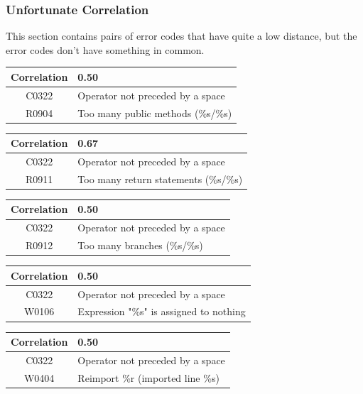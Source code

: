 \documentclass[12pt, a4paper]{article}
\newcommand{\tbf}[1]{\textbf{#1}}
\newcommand{\noi}{\noindent}
\begin{document}
\subsubsection*{Unfortunate Correlation}

This section contains pairs of error codes that have quite a low distance, but the error codes don't have something in common.

\bigskip \noi
\begin{tabularx}{\textwidth}{|c|X|}
\hline
\tbf{Correlation}		& 0.50 \\
\hline
C0322		& Operator not preceded by a space \\
\hline
R0904		& Too many public methods (\%s/\%s) \\
\hline
\end{tabularx}

\bigskip \noi
\begin{tabularx}{\textwidth}{|c|X|}
\hline
\tbf{Correlation}		& 0.67 \\
\hline
C0322		& Operator not preceded by a space \\
\hline
R0911		& Too many return statements (\%s/\%s) \\
\hline
\end{tabularx}


\bigskip \noi
\begin{tabularx}{\textwidth}{|c|X|}
\hline
\tbf{Correlation}		& 0.50 \\
\hline
C0322		& Operator not preceded by a space \\
\hline
R0912		& Too many branches (\%s/\%s) \\
\hline
\end{tabularx}


\bigskip \noi
\begin{tabularx}{\textwidth}{|c|X|}
\hline
\tbf{Correlation}		& 0.50 \\
\hline
C0322		& Operator not preceded by a space \\
\hline
W0106		& Expression "\%s" is assigned to nothing \\
\hline
\end{tabularx}


\bigskip \noi
\begin{tabularx}{\textwidth}{|c|X|}
\hline
\tbf{Correlation}		& 0.50 \\
\hline
C0322		& Operator not preceded by a space \\
\hline
W0404		& Reimport \%r (imported line \%s) \\
\hline
\end{tabularx}
\end{document}
